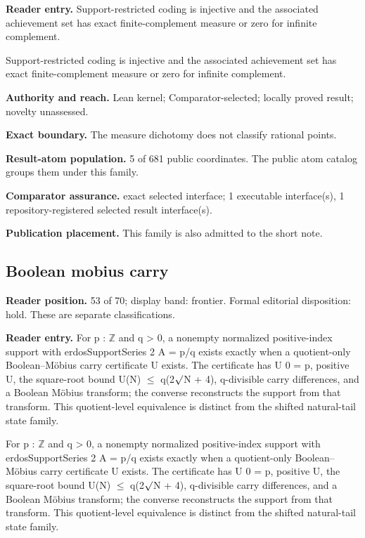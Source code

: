\textbf{Reader entry.} Support-restricted coding is injective and the associated achievement set has exact finite-complement measure or zero for infinite complement.

Support-restricted coding is injective and the associated achievement set has exact finite-complement measure or zero for infinite complement.

\textbf{Authority and reach.} Lean kernel; Comparator-selected; locally proved result; novelty unassessed.

\textbf{Exact boundary.} The measure dichotomy does not classify rational points.

\textbf{Result-atom population.} 5 of 681 public coordinates. The public atom catalog groups them under this family.

\textbf{Comparator assurance.} exact selected interface; 1 executable interface(s), 1 repository-registered selected result interface(s).

\textbf{Publication placement.} This family is also admitted to the short note.

\subsection{Boolean mobius carry}
\textbf{Reader position.} 53 of 70; display band: frontier.  Formal editorial disposition: hold.  These are separate classifications.

\textbf{Reader entry.} For p : \ensuremath{\mathbb{Z}} and q > 0, a nonempty normalized positive-index support with erdosSupportSeries 2 A = p/q exists exactly when a quotient-only Boolean–Möbius carry certificate U exists. The certificate has U 0 = p, positive U, the square-root bound U(N) \ensuremath{\le} q(2\ensuremath{\surd}N + 4), q-divisible carry differences, and a Boolean Möbius transform; the converse reconstructs the support from that transform. This quotient-level equivalence is distinct from the shifted natural-tail state family.

For p : \ensuremath{\mathbb{Z}} and q > 0, a nonempty normalized positive-index support with erdosSupportSeries 2 A = p/q exists exactly when a quotient-only Boolean–Möbius carry certificate U exists. The certificate has U 0 = p, positive U, the square-root bound U(N) \ensuremath{\le} q(2\ensuremath{\surd}N + 4), q-divisible carry differences, and a Boolean Möbius transform; the converse reconstructs the support from that transform. This quotient-level equivalence is distinct from the shifted natural-tail state family.

